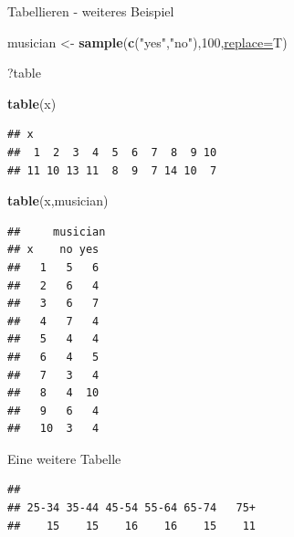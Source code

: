 \documentclass[
  ignorenonframetext,
]{beamer}
\newenvironment{Shaded}{\begin{snugshade}}{\end{snugshade}}
\newcommand{\DataTypeTok}[1]{\textcolor[rgb]{0.74,0.68,0.62}{\underline{#1}}}
\newcommand{\DecValTok}[1]{\textcolor[rgb]{0.27,0.67,0.26}{#1}}
\newcommand{\KeywordTok}[1]{\textcolor[rgb]{0.26,0.66,0.93}{\textbf{#1}}}
\newcommand{\NormalTok}[1]{\textcolor[rgb]{0.74,0.68,0.62}{#1}}
\newcommand{\OperatorTok}[1]{\textcolor[rgb]{0.74,0.68,0.62}{#1}}
\newcommand{\StringTok}[1]{\textcolor[rgb]{0.02,0.61,0.04}{#1}}
\begin{document}
\begin{frame}[fragile]{Tabellieren - weiteres Beispiel}
\protect\hypertarget{tabellieren---weiteres-beispiel}{}

\begin{Shaded}
\begin{Highlighting}[]
\NormalTok{musician <-}\StringTok{ }\KeywordTok{sample}\NormalTok{(}\KeywordTok{c}\NormalTok{(}\StringTok{"yes"}\NormalTok{,}\StringTok{"no"}\NormalTok{),}\DecValTok{100}\NormalTok{,}\DataTypeTok{replace=}\NormalTok{T)}
\end{Highlighting}
\end{Shaded}

\begin{Shaded}
\begin{Highlighting}[]
\NormalTok{?table}
\end{Highlighting}
\end{Shaded}

\begin{Shaded}
\begin{Highlighting}[]
\KeywordTok{table}\NormalTok{(x)}
\end{Highlighting}
\end{Shaded}

\begin{verbatim}
## x
##  1  2  3  4  5  6  7  8  9 10 
## 11 10 13 11  8  9  7 14 10  7
\end{verbatim}

\begin{Shaded}
\begin{Highlighting}[]
\KeywordTok{table}\NormalTok{(x,musician)}
\end{Highlighting}
\end{Shaded}

\begin{verbatim}
##     musician
## x    no yes
##   1   5   6
##   2   6   4
##   3   6   7
##   4   7   4
##   5   4   4
##   6   4   5
##   7   3   4
##   8   4  10
##   9   6   4
##   10  3   4
\end{verbatim}

\end{frame}

\begin{frame}[fragile]{Eine weitere Tabelle}
\protect\hypertarget{eine-weitere-tabelle}{}

\begin{Shaded}
\end{Shaded}

\begin{verbatim}
## 
## 25-34 35-44 45-54 55-64 65-74   75+ 
##    15    15    16    16    15    11
\end{verbatim}

\end{frame}
\end{document}
